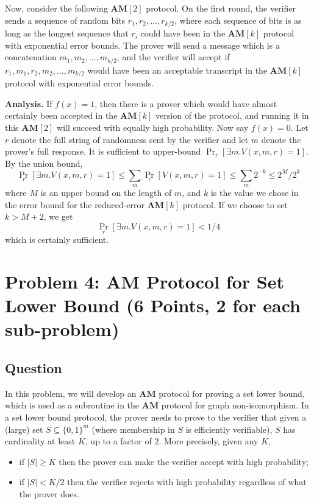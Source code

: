 \documentclass{article}
\newcommand{\AM}{\mathbf{AM}}
\begin{document}
Now, consider the following $\AM[2]$ protocol.  On the first round,
the verifier sends a sequence of random bits $r_1, r_2, \dots, r_{k/2}$,
where each sequence of bits is as long as the longest sequence that $r_i$ could have been in the $\AM[k]$ protocol with exponential error bounds.
The prover will send a message which is a concatenation $m_1, m_2, \dots, m_{k/2}$, and the verifier will accept if $r_1, m_1, r_2, m_2, \dots, m_{k/2}$ would have been an acceptable transcript in the $\AM[k]$ protocol with exponential error bounds.

\medskip
\noindent \textbf{Analysis.} If $f(x) = 1$, then there is a prover which would have almost certainly been accepted in the $\AM[k]$ version of the protocol, and running it in this $\AM[2]$ will succeed with equally high probability.
Now say $f(x) = 0$.  Let $r$ denote the full string of randomness sent by the verifier and let $m$ denote the prover's full response.
It is sufficient to upper-bound $\Pr_r[\exists m . V(x, m, r) = 1]$.
By the union bound,
$$
\Pr_r[\exists m . V(x, m, r) = 1] \leq \sum_{m}{\Pr_r[V(x, m, r) = 1]} \leq \sum_m{2^{-k}} \leq 2^M/2^k
$$
where $M$ is an upper bound on the length of $m$, and $k$ is the value we chose in the error bound for the reduced-error $\AM[k]$ protocol.
If we choose to set $k > M + 2$, we get 
$$
\Pr_r[\exists m . V(x, m, r) = 1] < 1/4
$$
which is certainly sufficient.


\newpage

\section*{Problem 4: AM Protocol for Set Lower Bound (6 Points, 2 for each sub-problem)}

\subsection*{Question}

In this problem, we will develop an $\AM$ protocol for proving a set lower bound, which is used as a subroutine in the $\AM$ protocol for graph non-isomorphism. In a set lower bound protocol, the prover needs to prove to the verifier that given a (large) set $S\subseteq \{0,1\}^m$ (where membership in $S$ is efficiently verifiable), $S$ has cardinality at least $K$, up to a factor of $2$. More precisely, given any $K$,
\begin{itemize}
\item  if $|S| \ge K$ then the prover can make the verifier accept with high probability; 
\item if $|S| < K/2$ then the verifier rejects with high probability regardless of what the prover does.
\end{itemize}
\end{document}
